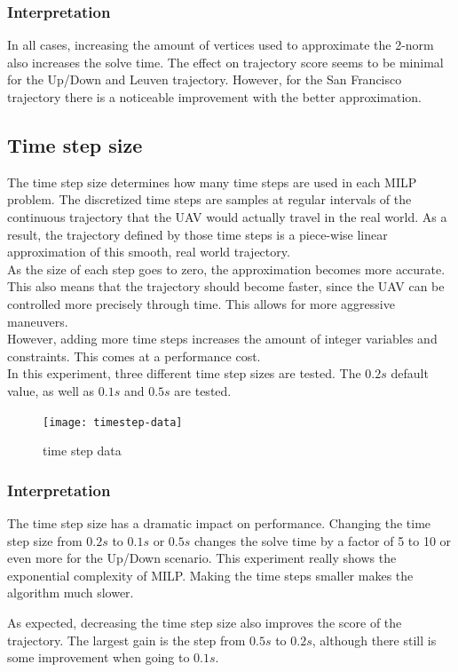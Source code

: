 \subsubsection{Interpretation}
In all cases, increasing the amount of vertices used to approximate the 2-norm also increases the solve time. The effect on trajectory score seems to be minimal for the Up/Down and Leuven trajectory. However, for the San Francisco trajectory there is a noticeable improvement with the better approximation.

\clearpage
\subsection{Time step size}
\label{subsec:timestep}
The time step size determines how many time steps are used in each MILP problem. The discretized time steps are samples at regular intervals of the continuous trajectory that the UAV would actually travel in the real world. As a result, the trajectory defined by those time steps is a piece-wise linear approximation of this smooth, real world trajectory. \\
As the size of each step goes to zero, the approximation becomes more accurate. This also means that the trajectory should become faster, since the UAV can be controlled more precisely through time. This allows for more aggressive maneuvers. \\
However, adding more time steps increases the amount of integer variables and constraints. This comes at a performance cost. \\
In this experiment, three different time step sizes are tested. The $0.2s$ default value, as well as $0.1s$ and $0.5s$ are tested.
\begin{figure}[]
	\centering
	\texttt{[image: timestep-data]}
	\caption{time step data}
	\label{fig:timestep-data}
\end{figure}
\subsubsection{Interpretation}
The time step size has a dramatic impact on performance. Changing the time step size from $0.2s$ to $0.1s$ or $0.5s$ changes the solve time by a factor of 5 to 10 or even more for the Up/Down scenario. This experiment really shows the exponential complexity of MILP. Making the time steps smaller makes the algorithm much slower.
\par
As expected, decreasing the time step size also improves the score of the trajectory. The largest gain is the step from $0.5s$ to $0.2s$, although there still is some improvement when going to $0.1s$.


